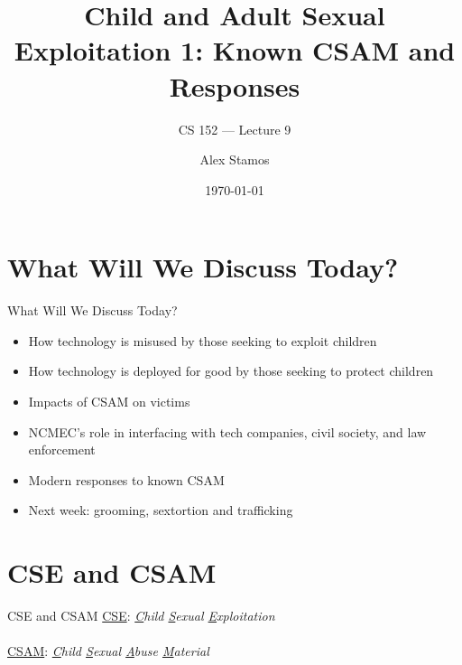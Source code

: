 \documentclass[nobackground,dvipsnames,table,aspectratio=169]{beamer}
\title{Child and Adult Sexual Exploitation 1: Known CSAM and Responses}
\subtitle{CS 152 --- Lecture 9}
\author[A. Stamos]{Alex Stamos}
\institute[Stanford University]{Stanford Cyber Policy Center}
\date[2022]{\today}
\begin{document}
\begin{frame}
    \titlepage
\end{frame}

\begin{frame}{}
    \thispagestyle{empty}
\end{frame}

\section{What Will We Discuss Today?}

\begin{frame}{What Will We Discuss Today?}
    \large
    \begin{itemize}
        \item How technology is misused by those seeking to exploit children
        \item How technology is deployed for good by those seeking to protect children
        \item Impacts of CSAM on victims
        \item NCMEC’s role in interfacing with tech companies, civil society, and law enforcement
        \item Modern responses to known CSAM
        \item Next week: grooming, sextortion and trafficking
    \end{itemize}
\end{frame}

\section{CSE and CSAM}

\begin{frame}{CSE and CSAM}
    \Large
    \underline{CSE}: \textit{\underline{C}hild \underline{S}exual \underline{E}xploitation}\\~\\
    \underline{CSAM}: \textit{\underline{C}hild \underline{S}exual \underline{A}buse \underline{M}aterial}
\end{frame}
\end{document}

